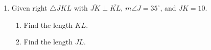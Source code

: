\documentclass[12pt, twoside]{article}
\begin{document}
\begin{enumerate}
    \item Given right $\triangle JKL$ with $\overline{JK} \perp \overline{KL}$, $m\angle J = 35^\circ$, and $JK=10$.\\
        \begin{multicols}{2}
          \raggedcolumns
          \begin{enumerate}
            \item Find the length $KL$. \vspace{2cm}
            \item Find the length $JL$. \vspace{1cm}
          \end{enumerate}
    \end{multicols}


  \end{enumerate}

\newpage
\setcounter{page}{1}
\end{document}
